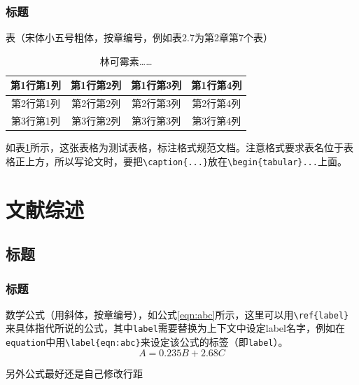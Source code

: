 \documentclass{ecustbachelorthesis}
\begin{document}
\subsection{标题}
\begin{subtext}
表（宋体小五号粗体，按章编号，例如表2.7为第2章第7个表）
\begin{center}
\vspace{-20pt}
\begin{longtable}{|c|c|c|c|}
\caption{林可霉素……}
\label{tab:linc} \\

\endfirsthead

\endhead

\endfoot

\endlastfoot
\hline
    第1行第1列 & 第1行第2列 & 第1行第3列 & 第1行第4列\\ \hline
    第2行第1列 & 第2行第2列 & 第2行第3列 & 第2行第4列\\ \hline
    第3行第1列 & 第3行第2列 & 第3行第3列 & 第3行第4列\\ \hline

\end{longtable}
\end{center}
\vspace{-42pt}

如表\ref{tab:linc}所示，这张表格为测试表格，标注格式规范文档。注意格式要求表名位于表格正上方，所以写论文时，要把\verb$\caption{...}$放在\verb$\begin{tabular}...$上面。
\end{subtext}
\chapter{文献综述}
\section{标题}
\subsection{标题}
\begin{subtext}
数学公式（用斜体，按章编号），如公式\ref{eqn:abc}所示，这里可以用\verb$\ref{label}$来具体指代所说的公式，其中\verb$label$需要替换为上下文中设定label名字，例如在\verb$equation$中用\verb$\label{eqn:abc}$来设定该公式的标签（即\verb$label$）。
\setlength{\abovedisplayskip}{0cm}
\setlength{\belowdisplayskip}{0cm}
\begin{equation}
A=0.235B+2.68C \label{eqn:abc}
\end{equation}

另外公式最好还是自己修改行距
\end{subtext}
\end{document}
